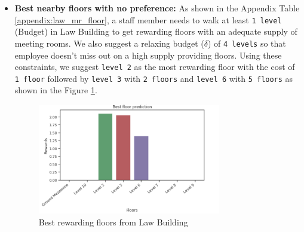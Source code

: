 \begin{itemize}
    \item \textbf{Best nearby floors with no preference:} As shown in the Appendix Table \ref{appendix:law_mr_floor}, a staff member needs to walk at least \texttt{1 level} (Budget) in Law Building to get rewarding floors with an adequate supply of meeting rooms. We also suggest a relaxing budget ($\delta$) of \texttt{4 levels} so that employee doesn't miss out on a high supply providing floors. Using these constraints, we suggest \texttt{level 2} as the most rewarding floor with the cost of \texttt{1 floor} followed by \texttt{level 3} with \texttt{2 floors} and \texttt{level 6} with \texttt{5 floors} as shown in the Figure \ref{fig:law-floor-no-factors}.

\begin{figure}[H]
\centering
  \includegraphics[width=8cm]{content/results/floors/plots/law-floor-no-factors.png}
\caption{Best rewarding floors from Law Building}
\label{fig:law-floor-no-factors}
\end{figure}




\end{itemize}
